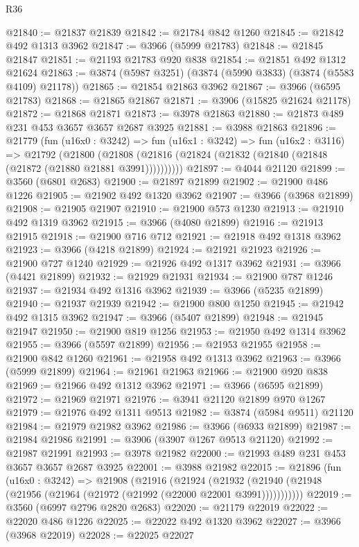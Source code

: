 \begin{lexlean}{R36}
\begin{coremodule}
@21840 := @21837 @21839
@21842 := @21784 @842 @1260
@21845 := @21842 @492 @1313 @3962
@21847 := @3966 (@5999 @21783)
@21848 := @21845 @21847
@21851 := @21193 @21783 @920 @838
@21854 := @21851 @492 @1312 @21624
@21863 := @3874 (@5987 @3251) (@3874 (@5990 @3833) (@3874 (@5583 @4109) @21178))
@21865 := @21854 @21863 @3962
@21867 := @3966 (@6595 @21783)
@21868 := @21865 @21867
@21871 := @3906 (@15825 @21624 @21178)
@21872 := @21868 @21871
@21873 := @3978 @21863
@21880 := @21873 @489 @231 @453 @3657 @3657 @2687 @3925
@21881 := @3988 @21863
@21896 := @21779
    (fun (u16x0 : @3242) =>
    fun (u16x1 : @3242) =>
    fun (u16x2 : @3116) =>
    @21792
      (@21800 (@21808 (@21816 (@21824 (@21832 (@21840 (@21848 (@21872 (@21880 @21881 @3991))))))))))
@21897 := @4044 @21120
@21899 := @3560 (@6801 @2683)
@21900 := @21897 @21899
@21902 := @21900 @486 @1226
@21905 := @21902 @492 @1320 @3962
@21907 := @3966 (@3968 @21899)
@21908 := @21905 @21907
@21910 := @21900 @573 @1230
@21913 := @21910 @492 @1319 @3962
@21915 := @3966 (@4080 @21899)
@21916 := @21913 @21915
@21918 := @21900 @716 @712
@21921 := @21918 @492 @1318 @3962
@21923 := @3966 (@4218 @21899)
@21924 := @21921 @21923
@21926 := @21900 @727 @1240
@21929 := @21926 @492 @1317 @3962
@21931 := @3966 (@4421 @21899)
@21932 := @21929 @21931
@21934 := @21900 @787 @1246
@21937 := @21934 @492 @1316 @3962
@21939 := @3966 (@5235 @21899)
@21940 := @21937 @21939
@21942 := @21900 @800 @1250
@21945 := @21942 @492 @1315 @3962
@21947 := @3966 (@5407 @21899)
@21948 := @21945 @21947
@21950 := @21900 @819 @1256
@21953 := @21950 @492 @1314 @3962
@21955 := @3966 (@5597 @21899)
@21956 := @21953 @21955
@21958 := @21900 @842 @1260
@21961 := @21958 @492 @1313 @3962
@21963 := @3966 (@5999 @21899)
@21964 := @21961 @21963
@21966 := @21900 @920 @838
@21969 := @21966 @492 @1312 @3962
@21971 := @3966 (@6595 @21899)
@21972 := @21969 @21971
@21976 := @3941 @21120 @21899 @970 @1267
@21979 := @21976 @492 @1311 @9513
@21982 := @3874 (@5984 @9511) @21120
@21984 := @21979 @21982 @3962
@21986 := @3966 (@6933 @21899)
@21987 := @21984 @21986
@21991 := @3906 (@3907 @1267 @9513 @21120)
@21992 := @21987 @21991
@21993 := @3978 @21982
@22000 := @21993 @489 @231 @453 @3657 @3657 @2687 @3925
@22001 := @3988 @21982
@22015 := @21896
    (fun (u16x0 : @3242) =>
    @21908
      (@21916
        (@21924
          (@21932 (@21940 (@21948 (@21956 (@21964 (@21972 (@21992 (@22000 @22001 @3991)))))))))))
@22019 := @3560 (@6997 @2796 @2820 @2683)
@22020 := @21179 @22019
@22022 := @22020 @486 @1226
@22025 := @22022 @492 @1320 @3962
@22027 := @3966 (@3968 @22019)
@22028 := @22025 @22027

\end{coremodule}
\end{lexlean}
